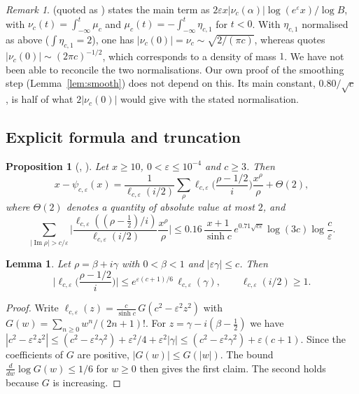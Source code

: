 \documentclass[11pt]{amsart}
\numberwithin{equation}{section}
\newtheorem{lemma}[theorem]{Lemma}
\newtheorem{proposition}[theorem]{Proposition}
\theoremstyle{definition}
\theoremstyle{remark}
\newtheorem{remark}[theorem]{Remark}
\newcommand{\Ip}{\operatorname{Im}}
\newcommand{\eps}{\varepsilon}
\begin{document}
\begin{remark}\label{rem:buthe}
\cite[Prop.~4]{Buthe2016} (quoted as \cite[Prop.~1]{Buthe2018}) states the main term as $2\eps x|\nu_c(\alpha)|\log(e^\eps x)/\log B$, with $\nu_c(t) = \int_{-\infty}^t\mu_c$ and $\mu_c(t) = -\int_{-\infty}^t\eta_{c,1}$ for $t<0$.
With $\eta_{c,1}$ normalised as above ($\int\eta_{c,1} = 2$), one has $|\nu_c(0)| = \nu_c \sim \sqrt{2/(\pi c)}$, whereas \cite[Remark~1]{Buthe2018} quotes $|\nu_c(0)|\sim(2\pi c)^{-1/2}$, which corresponds to a density of mass $1$.
We have not been able to reconcile the two normalisations.
Our own proof of the smoothing step (Lemma~\ref{lem:smooth}) does not depend on this.
Its main constant, $0.80/\sqrt c$, is half of what $2|\nu_c(0)|$ would give with the stated normalisation.
\end{remark}

\subsection{Explicit formula and truncation}
\begin{proposition}[{\cite[Prop.~2]{Buthe2018}, \cite[Props.~2,3]{Buthe2016}}]\label{prop:explicit}
Let $x \ge 10$, $0 < \eps \le 10^{-4}$ and $c \ge 3$. Then
\[
x - \psi_{c,\eps}(x) = \frac{1}{\ell_{c,\eps}(i/2)}\sum_\rho \ell_{c,\eps}\!\Big(\frac{\rho - 1/2}{i}\Big)\frac{x^\rho}{\rho} + \Theta(2),
\]
where $\Theta(2)$ denotes a quantity of absolute value at most $2$, and
\[
\sum_{|\Ip\rho| > c/\eps}\Big|\frac{\ell_{c,\eps}((\rho-\frac12)/i)}{\ell_{c,\eps}(i/2)}\frac{x^\rho}{\rho}\Big| \le 0.16\,\frac{x+1}{\sinh c}\,e^{0.71\sqrt{c\eps}}\log(3c)\log\frac c\eps .
\]
\end{proposition}

\begin{lemma}\label{lem:logancomplex}
Let $\rho = \beta + i\gamma$ with $0 < \beta < 1$ and $|\eps\gamma| \le c$. Then
\[
\Big|\ell_{c,\eps}\Big(\frac{\rho - 1/2}{i}\Big)\Big| \le e^{\eps(c+1)/6}\,\ell_{c,\eps}(\gamma),
\qquad \ell_{c,\eps}(i/2) \ge 1 .
\]
\end{lemma}

\begin{proof}
Write $\ell_{c,\eps}(z) = \frac{c}{\sinh c}\,G(c^2 - \eps^2z^2)$ with $G(w) = \sum_{n\ge0}w^n/(2n+1)!$.
For $z = \gamma - i(\beta-\frac12)$ we have
$|c^2 - \eps^2 z^2| \le (c^2 - \eps^2\gamma^2) + \eps^2/4 + \eps^2|\gamma| \le (c^2 - \eps^2\gamma^2) + \eps(c+1)$.
Since the coefficients of $G$ are positive, $|G(w)| \le G(|w|)$.
The bound $\frac{d}{dw}\log G(w) \le 1/6$ for $w \ge 0$ then gives the first claim.
The second holds because $G$ is increasing.
\end{proof}
\end{document}
